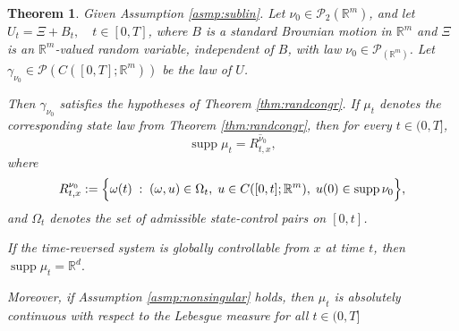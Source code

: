 \documentclass{article}
\newtheorem{theorem}{Theorem}[section]
\begin{document}
\begin{theorem}
Given Assumption \ref{asmp:sublin}. Let $\nu_0 \in \mathcal P_2(\mathbb R^m)$, and let
$U_t = \Xi + B_t, \quad t\in[0,T]$,
where $B$ is a standard Brownian motion in $\mathbb R^m$ and $\Xi$ is an
$\mathbb R^m$-valued random variable, independent of $B$, with law $\nu_0 \in \mathcal{P}_(\mathbb{R}^m)$.
Let $\gamma_{\nu_0} \in \mathcal P(C([0,T];\mathbb R^m))$ be the law of $U$.

Then $\gamma_{\nu_0}$ satisfies the hypotheses of Theorem \ref{thm:randcongr}.
If $\mu_t$ denotes the corresponding state law from Theorem \ref{thm:randcongr},
then for every $t\in(0,T]$,
\[
\operatorname{supp}\mu_t = \overline{R^{\nu_0}_{t,x}},
\]
where
\[
R^{\nu_0}_{t,x}
:=
\Bigl\{
\omega(t) \;:\;
(\omega,u)\in \Omega_t,\;
u\in C([0,t];\mathbb R^m),\;
u(0)\in \operatorname{supp}\nu_0
\Bigr\},
\]
and $\Omega_t$ denotes the set of admissible state-control pairs on $[0,t]$.

If the time-reversed system is globally controllable from $x$ at time $t$,
then $
\operatorname{supp}\mu_t = \mathbb R^d.$

Moreover, if Assumption \ref{asmp:nonsingular} holds, then $
\mu_t$ is absolutely continuous with respect to the Lebesgue measure for all $ t\in(0,T]$
\end{theorem}
\end{document}

